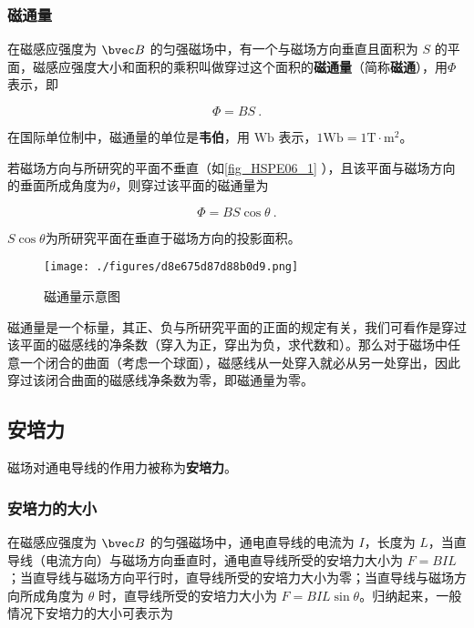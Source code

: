 \subsubsection{磁通量}

在磁感应强度为 $\bvec B$ 的匀强磁场中，有一个与磁场方向垂直且面积为 $S$ 的平面，磁感应强度大小和面积的乘积叫做穿过这个面积的\textbf{磁通量}（简称\textbf{磁通}），用$\Phi$表示，即

\begin{equation}
\Phi = BS~.
\end{equation}

在国际单位制中，磁通量的单位是\textbf{韦伯}，用 $\mathrm{Wb}$ 表示，$1\mathrm{Wb}=1\mathrm{T\cdot m^2}$。

若磁场方向与所研究的平面不垂直（如\autoref{fig_HSPE06_1} ），且该平面与磁场方向的垂面所成角度为$\theta$，则穿过该平面的磁通量为

\begin{equation}
\Phi = BS\cos\theta~.
\end{equation}

$S\cos\theta$为所研究平面在垂直于磁场方向的投影面积。

\begin{figure}[ht]
\centering
\texttt{[image: ./figures/d8e675d87d88b0d9.png]}
\caption{磁通量示意图} \label{fig_HSPE06_1}
\end{figure}


磁通量是一个标量，其正、负与所研究平面的正面的规定有关，我们可看作是穿过该平面的磁感线的净条数（穿入为正，穿出为负，求代数和）。那么对于磁场中任意一个闭合的曲面（考虑一个球面），磁感线从一处穿入就必从另一处穿出，因此穿过该闭合曲面的磁感线净条数为零，即磁通量为零。

\subsection{安培力}

磁场对通电导线的作用力被称为\textbf{安培力}。

\subsubsection{安培力的大小}

在磁感应强度为 $\bvec B$ 的匀强磁场中，通电直导线的电流为 $I$，长度为 $L$，当直导线（电流方向）与磁场方向垂直时，通电直导线所受的安培力大小为 $F=BIL$；当直导线与磁场方向平行时，直导线所受的安培力大小为零；当直导线与磁场方向所成角度为 $\theta$ 时，直导线所受的安培力大小为 $F=BIL\sin\theta$。归纳起来，一般情况下安培力的大小可表示为

